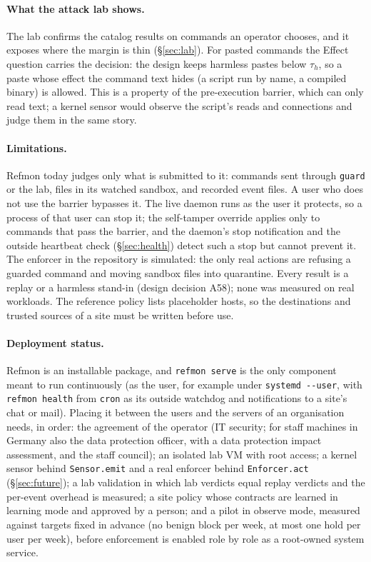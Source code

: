 \documentclass[10pt,twocolumn,letterpaper]{article}
\makeatletter
\theoremstyle{plain}
\theoremstyle{definition}
\theoremstyle{remark}
\DeclareRobustCommand{\_}{\ifmmode\nfss@text{\textunderscore}\else\textunderscore\penalty\@highpenalty\hskip\z@skip\fi}
\makeatother
\begin{document}
\paragraph{What the attack lab shows.} The lab confirms the catalog results on commands an operator chooses, and it exposes where the margin is thin (\S\ref{sec:lab}). For pasted commands the Effect question carries the decision: the design keeps harmless pastes below $\tau_h$, so a paste whose effect the command text hides (a script run by name, a compiled binary) is allowed. This is a property of the pre-execution barrier, which can only read text; a kernel sensor would observe the script's reads and connections and judge them in the same story.

\paragraph{Limitations.} Refmon today judges only what is submitted to it: commands sent through \texttt{guard} or the lab, files in its watched sandbox, and recorded event files. A user who does not use the barrier bypasses it. The live daemon runs as the user it protects, so a process of that user can stop it; the self-tamper override applies only to commands that pass the barrier, and the daemon's stop notification and the outside heartbeat check (\S\ref{sec:health}) detect such a stop but cannot prevent it. The enforcer in the repository is simulated: the only real actions are refusing a guarded command and moving sandbox files into quarantine. Every result is a replay or a harmless stand-in (design decision A58); none was measured on real workloads. The reference policy lists placeholder hosts, so the destinations and trusted sources of a site must be written before use.

\paragraph{Deployment status.} Refmon is an installable package, and \texttt{refmon serve} is the only component meant to run continuously (as the user, for example under \texttt{systemd -{}-user}, with \texttt{refmon health} from \texttt{cron} as its outside watchdog and notifications to a site's chat or mail). Placing it between the users and the servers of an organisation needs, in order: the agreement of the operator (IT security; for staff machines in Germany also the data protection officer, with a data protection impact assessment, and the staff council); an isolated lab VM with root access; a kernel sensor behind \texttt{Sensor.emit} and a real enforcer behind \texttt{Enforcer.act} (\S\ref{sec:future}); a lab validation in which lab verdicts equal replay verdicts and the per-event overhead is measured; a site policy whose contracts are learned in learning mode and approved by a person; and a pilot in observe mode, measured against targets fixed in advance (no benign block per week, at most one hold per user per week), before enforcement is enabled role by role as a root-owned system service.
\end{document}
